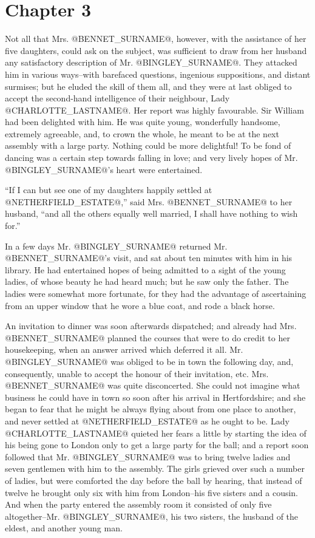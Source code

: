\chapter*{Chapter 3}


Not all that Mrs. @BENNET_SURNAME@, however, with the assistance of her five
daughters, could ask on the subject, was sufficient to draw from her
husband any satisfactory description of Mr. @BINGLEY_SURNAME@. They attacked him
in various ways--with barefaced questions, ingenious suppositions, and
distant surmises; but he eluded the skill of them all, and they were at
last obliged to accept the second-hand intelligence of their neighbour,
Lady @CHARLOTTE_LASTNAME@. Her report was highly favourable. Sir William had been
delighted with him. He was quite young, wonderfully handsome, extremely
agreeable, and, to crown the whole, he meant to be at the next assembly
with a large party. Nothing could be more delightful! To be fond of
dancing was a certain step towards falling in love; and very lively
hopes of Mr. @BINGLEY_SURNAME@'s heart were entertained.

``If I can but see one of my daughters happily settled at @NETHERFIELD_ESTATE@,''
said Mrs. @BENNET_SURNAME@ to her husband, ``and all the others equally well
married, I shall have nothing to wish for.''

In a few days Mr. @BINGLEY_SURNAME@ returned Mr. @BENNET_SURNAME@'s visit, and sat about
ten minutes with him in his library. He had entertained hopes of being
admitted to a sight of the young ladies, of whose beauty he had
heard much; but he saw only the father. The ladies were somewhat more
fortunate, for they had the advantage of ascertaining from an upper
window that he wore a blue coat, and rode a black horse.

An invitation to dinner was soon afterwards dispatched; and already
had Mrs. @BENNET_SURNAME@ planned the courses that were to do credit to her
housekeeping, when an answer arrived which deferred it all. Mr. @BINGLEY_SURNAME@
was obliged to be in town the following day, and, consequently, unable
to accept the honour of their invitation, etc. Mrs. @BENNET_SURNAME@ was quite
disconcerted. She could not imagine what business he could have in town
so soon after his arrival in Hertfordshire; and she began to fear that
he might be always flying about from one place to another, and never
settled at @NETHERFIELD_ESTATE@ as he ought to be. Lady @CHARLOTTE_LASTNAME@ quieted her fears
a little by starting the idea of his being gone to London only to get
a large party for the ball; and a report soon followed that Mr. @BINGLEY_SURNAME@
was to bring twelve ladies and seven gentlemen with him to the assembly.
The girls grieved over such a number of ladies, but were comforted the
day before the ball by hearing, that instead of twelve he brought only
six with him from London--his five sisters and a cousin. And when
the party entered the assembly room it consisted of only five
altogether--Mr. @BINGLEY_SURNAME@, his two sisters, the husband of the eldest, and
another young man.

